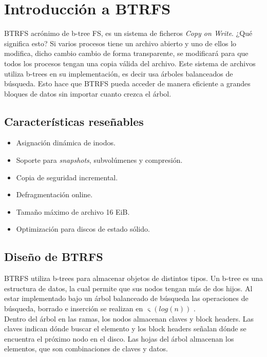 \section{Introducción a BTRFS}
BTRFS acrónimo de b-tree FS, es un sistema de ficheros \textit{Copy on Write}. ¿Qué significa esto? Si varios procesos tiene un archivo abierto y uno de ellos lo modifica, dicho cambio cambio de forma transparente, se modificará para que todos los procesos tengan una copia válida del archivo. Este sistema de archivos utiliza b-trees en su implementación, es decir usa árboles balanceados de búsqueda. Esto hace que BTRFS pueda acceder de manera eficiente a grandes bloques de datos sin importar cuanto crezca el árbol.

\subsection{Características reseñables}
\begin{itemize}
    \item Asignación dinámica de inodos.
    \item Soporte para \textit{snapshots}, subvolúmenes y compresión.
    \item Copia de seguridad incremental.
    \item Defragmentación online.
    \item Tamaño máximo de archivo 16 EiB.
    \item Optimización para discos de estado sólido.
\end{itemize}

\subsection{Diseño de BTRFS}
BTRFS utiliza b-trees para almacenar objetos de distintos tipos. Un b-tree es una estructura de datos, la cual permite que sus nodos tengan más de dos hijos. Al estar implementado bajo un árbol balanceado de búsqueda las operaciones de búsqueda, borrado e inserción se realizan en
\begin{math}
\mathrm{\upvarsigma}(log(n))
\end{math}
\cite{henson}.
\\

Dentro del árbol en las ramas, los nodos almacenan claves y block headers. Las claves  indican dónde buscar el elemento y los block headers señalan dónde se encuentra el próximo nodo en el disco.
Las hojas del árbol almacenan los elementos, que son combinaciones de claves y datos.
\\

